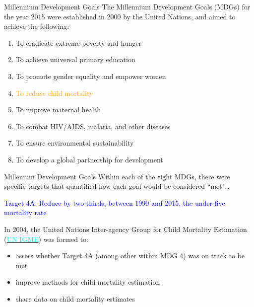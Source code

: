 \documentclass[10pt,t]{beamer}
\begin{document}
\begin{frame}{Millennium Development Goals}
The Millennium Development Goals (MDGs) for the year 2015 were established in 2000 by the United Nations, and aimed to achieve the following:
\vspace{0.3cm}

\begin{enumerate}
	\item To eradicate extreme poverty and hunger
	\item To achieve universal primary education
	\item To promote gender equality and empower women
	\item \textcolor{orange}{To reduce child mortality}
	\item To improve maternal health
	\item To combat HIV/AIDS, malaria, and other diseases
	\item To ensure environmental sustainability
	\item To develop a global partnership for development
\end{enumerate} \pause

\end{frame}

\begin{frame}{Millenium Development Goals}
Within each of the eight MDGs, there were specific targets that quantified how each goal would be considered ``met"\dots \pause

\vspace{0.3cm}

\textcolor{blue}{Target 4A: Reduce by two-thirds, between 1990 and 2015, the under-five mortality rate} \pause

\vspace{0.3cm}

In 2004, the United Nations Inter-agency Group for Child Mortality Estimation (\href{https://childmortality.org/}{\textcolor{cyan}{UN IGME}}) was formed to:

\vspace{0.3cm}

\begin{itemize}
	\item assess whether Target 4A (among other within MDG 4) was on track to be met
	\item improve methods for child mortality estimation
	\item share data on child mortality estimates
\end{itemize}

\end{frame}
\end{document}
